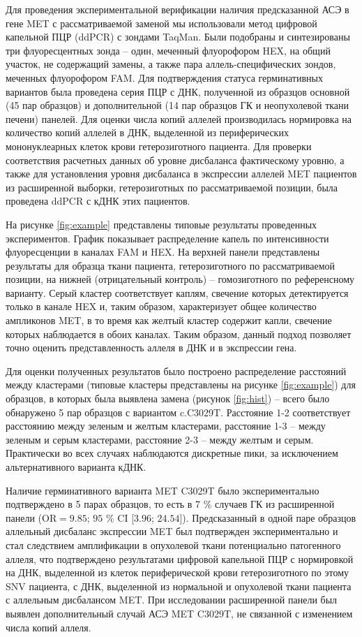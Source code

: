 Для проведения экспериментальной верификации наличия предсказанной АСЭ в гене MET с рассматриваемой заменой мы использовали метод цифровой капельной ПЦР (ddPCR) с зондами TaqMan. Были подобраны и синтезированы три флуоресцентных зонда – один, меченный флуорофором HEX, на общий участок, не содержащий замены, а также пара аллель-специфических зондов, меченных флуорофором FAM. Для подтверждения статуса герминативных вариантов была проведена серия ПЦР с ДНК, полученной из образцов основной (45 пар образцов) и дополнительной (14 пар образцов ГК и неопухолевой ткани печени) панелей. Для оценки числа копий аллелей производилась нормировка на количество копий аллелей в ДНК, выделенной из периферических мононуклеарных клеток крови гетерозиготного пациента. Для проверки соответствия расчетных данных об уровне дисбаланса фактическому уровню, а также для установления уровня дисбаланса в экспрессии аллелей MET пациентов из расширенной выборки, гетерозиготных по рассматриваемой позиции, была проведена ddPCR с кДНК этих пациентов.

На рисунке \ref{fig:example} представлены типовые результаты проведенных экспериментов. График показывает распределение капель по интенсивности флуоресценции в каналах FAM и HEX. На верхней панели представлены результаты для образца ткани пациента, гетерозиготного по рассматриваемой позиции, на нижней (отрицательный контроль) – гомозиготного по референсному варианту. Серый кластер соответствует каплям, свечение которых детектируется только в канале HEX и, таким образом, характеризует общее количество ампликонов MET, в то время как желтый кластер содержит капли, свечение которых наблюдается в обоих каналах. Таким образом, данный подход позволяет точно оценить представленность аллеля в ДНК и в экспрессии гена.

Для оценки полученных результатов было построено распределение расстояний между кластерами (типовые кластеры представлены на рисунке \ref{fig:example}) для образцов, в которых была выявлена замена (рисунок \ref{fig:hist}) – всего было обнаружено 5 пар образцов с вариантом c.C3029T. Расстояние 1-2 соответствует расстоянию между зеленым и желтым кластерами, расстояние 1-3 – между зеленым и серым кластерами, расстояние 2-3 – между желтым и серым.  Практически во всех случаях наблюдаются дискретные пики, за исключением альтернативного варианта кДНК. 

Наличие герминативного варианта MET C3029T было экспериментально подтверждено в 5 парах образцов, то есть в 7 \% случаев ГК из расширенной панели (OR$=9.85$; $95$ \% CI [$3.96$; $24.54$]). Предсказанный в одной паре образцов аллельный дисбаланс экспрессии MET был подтвержден экспериментально и стал следствием амплификации в опухолевой ткани потенциально патогенного аллеля, что подтверждено результатами цифровой капельной ПЦР с нормировкой на ДНК, выделенной из клеток периферической крови гетерозиготного по этому SNV пациента, с ДНК, выделенной из нормальной и опухолевой ткани пациента с аллельным дисбалансом MET. При исследовании расширенной панели был выявлен дополнительный случай АСЭ MET C3029T, не связанной с изменением числа копий аллеля. 

